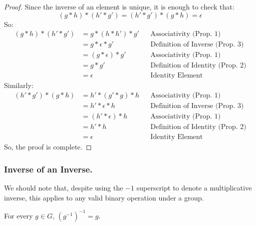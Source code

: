 \documentclass[letterpaper]{article}
\begin{document}
\begin{framed}
    \begin{proof}
        Since the inverse of an element is unique, it is enough to check that: 
        \[(g * h) * (h' * g') = (h' * g') * (g * h) = \epsilon\]
        So: 
        \begin{equation*}
            \begin{aligned}
                (g * h) * (h' * g') &= g * (h * h') * g' && \text{Associativity (Prop. 1)} \\ 
                    &= g * \epsilon * g' && \text{Definition of Inverse (Prop. 3)} \\ 
                    &= (g * \epsilon) * g' && \text{Associativity (Prop. 1)} \\ 
                    &= g * g' && \text{Definition of Identity (Prop. 2)} \\ 
                    &= \epsilon && \text{Identity Element}
            \end{aligned}
        \end{equation*}
        Similarly: 
        \begin{equation*}
            \begin{aligned}
                (h' * g') * (g * h) &= h' * (g' * g) * h && \text{Associativity (Prop. 1)} \\ 
                    &= h' * \epsilon * h && \text{Definition of Inverse (Prop. 3)} \\ 
                    &= (h' * \epsilon) * h && \text{Associativity (Prop. 1)} \\ 
                    &= h' * h && \text{Definition of Identity (Prop. 2)} \\ 
                    &= \epsilon && \text{Identity Element}
            \end{aligned}
        \end{equation*}
        So, the proof is complete. 
    \end{proof}
\end{framed}

\subsubsection{Inverse of an Inverse.}
We should note that, despite using the $-1$ superscript to denote a multiplicative inverse, this applies to any valid binary operation under a group. 

\begin{lemma}{}{}
    For every $g \in G$, $(g^{-1})^{-1} = g$. 
\end{lemma}
\end{document}
